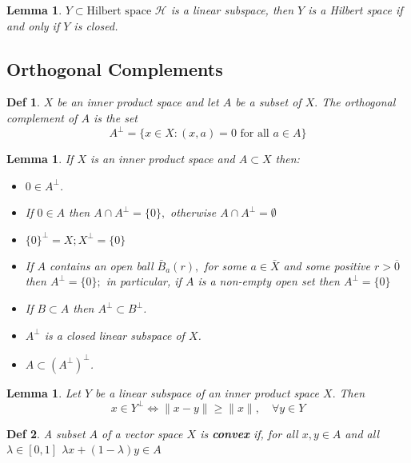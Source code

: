 \documentclass[10pt]{paper}
\newtheorem{definition}{Def}[section]
\newtheorem{lemma}[theorem]{Lemma}
\begin{document}
\begin{lemma}
    $Y \subset \text{Hilbert space } \mathcal{H}$ is a linear subspace, then $Y$ is a Hilbert space if and only if $Y$ is closed.
\end{lemma}

\subsection{Orthogonal Complements}

\begin{definition}
    $X$ be an inner product space and let $A$ be a subset of $X .$ The orthogonal complement of $A$ is the set
    $$
        A^{\perp}=\{x \in X:(x, a)=0 \text { for all } a \in A\}
    $$
\end{definition}

\begin{lemma}
    If $X$ is an inner product space and $A \subset X$ then:
    \begin{itemize}
        \item $0 \in A^{\perp}$.
        \item If $0 \in A$ then $A \cap A^{\perp}=\{0\},$ otherwise $A \cap A^{\perp}=\emptyset$
        \item $\{0\}^{\perp}=X ; X^{\perp}=\{0\}$
        \item If $A$ contains an open ball $\bar{B}_{a}(r),$ for some $a \in \bar{X}$ and some positive $r>\overline{0}$ then $A^{\perp}=\{0\} ;$ in particular, if $A$ is a non-empty open set then $A^{\perp}=\{0\}$
        \item If $B \subset A$ then $A^{\perp} \subset B^{\perp}$.
        \item $A^{\perp}$ is a closed linear subspace of $X$.
        \item $A \subset\left(A^{\perp}\right)^{\perp}$.
    \end{itemize}
\end{lemma}

\begin{lemma}
    Let $Y$ be a linear subspace of an inner product space $X .$ Then
    $$
        x \in Y^{\perp} \Longleftrightarrow\|x-y\| \geq\|x\|, \quad \forall y \in Y
    $$
\end{lemma}

\begin{definition}
    A subset $A$ of a vector space $X$ is \textbf{convex} if, for all $x, y \in A$ and all $\lambda \in[0,1]$ $\lambda x+(1-\lambda) y \in A$
\end{definition}
\end{document}
